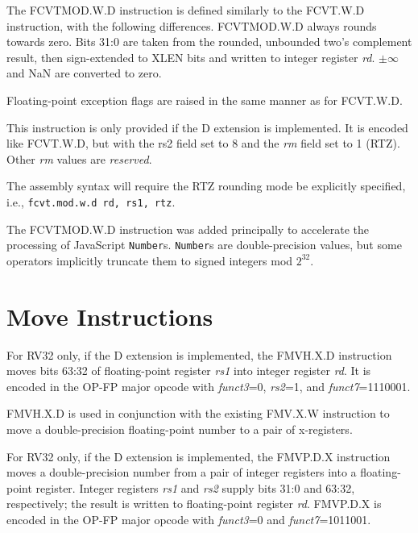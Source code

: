 The FCVTMOD.W.D instruction is defined similarly to the FCVT.W.D
instruction, with the following differences.
FCVTMOD.W.D always rounds towards zero.
Bits 31:0 are taken from the rounded, unbounded two's complement result,
then sign-extended to XLEN bits and written to integer register {\em rd}.
$\pm\infty$ and NaN are converted to zero.

Floating-point exception flags are raised in the same manner as for FCVT.W.D.

This instruction is only provided if the D extension is implemented.
It is encoded like FCVT.W.D, but with the {\rm rs2} field set to 8
and the {\em rm} field set to 1 (RTZ).
Other {\em rm} values are {\em reserved}.

\begin{commentary}
The assembly syntax will require the RTZ rounding mode be explicitly
specified, i.e., {\tt fcvt.mod.w.d rd, rs1, rtz}.
\end{commentary}

\begin{commentary}
The FCVTMOD.W.D instruction was added principally to accelerate the
processing of JavaScript {\tt Number}s.
{\tt Number}s are double-precision values, but some operators implicitly
truncate them to signed integers mod $2^{32}$.
\end{commentary}


\section{Move Instructions}

For RV32 only, if the D extension is implemented,
the FMVH.X.D instruction moves bits 63:32 of floating-point register {\em rs1}
into integer register {\em rd}.
It is encoded in the OP-FP major opcode with {\em funct3}=0, {\em rs2}=1,
and {\em funct7}=1110001.

\begin{commentary}
FMVH.X.D is used in conjunction with the existing FMV.X.W instruction to move
a double-precision floating-point number to a pair of x-registers.
\end{commentary}

For RV32 only, if the D extension is implemented,
the FMVP.D.X instruction moves a double-precision number from a pair of integer
registers into a floating-point register.  Integer registers {\em rs1} and
{\em rs2} supply bits 31:0 and 63:32, respectively; the result is written to
floating-point register {\em rd}.
FMVP.D.X is encoded in the OP-FP major opcode with {\em funct3}=0
and {\em funct7}=1011001.

